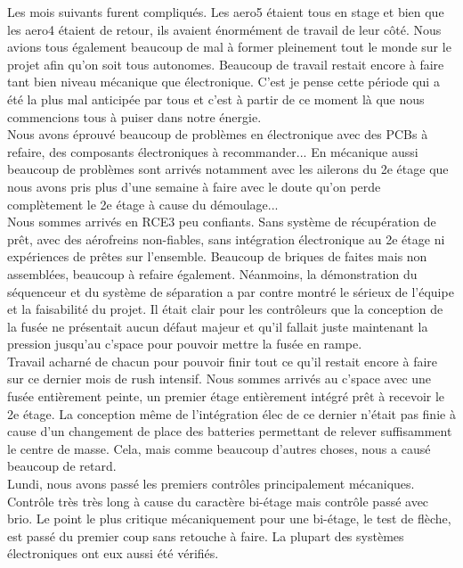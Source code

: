 \documentclass{article}
\begin{document}
Les mois suivants furent compliqués. Les aero5 étaient tous en stage et bien que les aero4 étaient de retour, ils avaient
énormément de travail de leur côté. Nous avions tous également beaucoup de mal à former pleinement tout le monde sur le
projet afin qu'on soit tous autonomes. Beaucoup de travail restait encore à faire tant bien niveau mécanique que
électronique. C'est je pense cette période qui a été la plus mal anticipée par tous et c'est à partir de ce moment là que
nous commencions tous à puiser dans notre énergie.\\

Nous avons éprouvé beaucoup de problèmes en électronique avec des PCBs à refaire, des composants électroniques à
recommander... En mécanique aussi beaucoup de problèmes sont arrivés notamment avec les ailerons du 2e étage que nous avons
pris plus d'une semaine à faire avec le doute qu'on perde complètement le 2e étage à cause du démoulage...\\

Nous sommes arrivés en RCE3 peu confiants. Sans système de récupération de prêt, avec des aérofreins non-fiables, sans
intégration électronique au 2e étage ni expériences de prêtes sur l'ensemble. Beaucoup de briques de faites mais non
assemblées, beaucoup à refaire également. Néanmoins, la démonstration du séquenceur et du système de séparation a par contre
montré le sérieux de l'équipe et la faisabilité du projet. Il était clair pour les contrôleurs que la conception de la fusée
ne présentait aucun défaut majeur et qu'il fallait juste maintenant la pression jusqu'au c'space pour pouvoir mettre la fusée
en rampe.\\

Travail acharné de chacun pour pouvoir finir tout ce qu'il restait encore à faire sur ce dernier mois de rush intensif. Nous
sommes arrivés au c'space avec une fusée entièrement peinte, un premier étage entièrement intégré prêt à recevoir le 2e
étage. La conception même de l'intégration élec de ce dernier n'était pas finie à cause d'un changement de place des
batteries permettant de relever suffisamment le centre de masse. Cela, mais comme beaucoup d'autres choses, nous a causé
beaucoup de retard.\\

Lundi, nous avons passé les premiers contrôles principalement mécaniques. Contrôle très très long à cause du caractère
bi-étage mais contrôle passé avec brio. Le point le plus critique mécaniquement pour une bi-étage, le test de flèche, est
passé du premier coup sans retouche à faire. La plupart des systèmes électroniques ont eux aussi été vérifiés.\\
\end{document}
